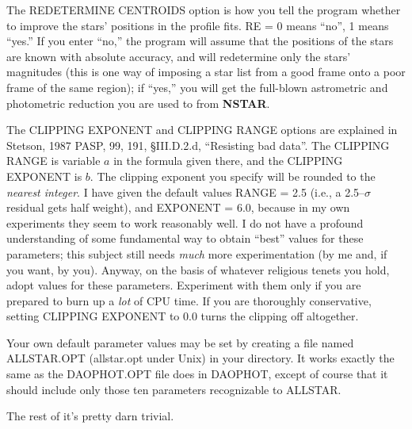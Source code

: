 The REDETERMINE CENTROIDS option is how you tell the program whether
to improve the stars' positions in the profile fits.  RE = 0 means
``no'', 1 means ``yes.''  If you enter ``no,'' the program will
assume that the positions of the stars are known with absolute
accuracy, and will redetermine only the stars' magnitudes (this is
one way of imposing a star list from a good frame onto a poor frame
of the same region); if ``yes,'' you will get the full-blown
astrometric and photometric reduction you are used to from {\bf NSTAR}.

The CLIPPING EXPONENT and CLIPPING RANGE options are explained in
Stetson, 1987 PASP, 99, 191, \S III.D.2.d, ``Resisting bad data''.  The
CLIPPING RANGE is variable $a$ in the formula given there, and the
CLIPPING EXPONENT is $b$.  The clipping exponent you specify will be
rounded to the {\it nearest integer\/}.  I have given the default
values RANGE = 2.5 (i.e., a 2.5--$\sigma$ residual gets half weight),
and EXPONENT = 6.0, because in my own experiments they seem to work
reasonably well. I do not have a profound understanding of some
fundamental way to obtain ``best'' values for these parameters; this
subject still needs {\it much\/} more experimentation (by me and, if
you want, by you).  Anyway, on the basis of whatever religious tenets
you hold, adopt values for these parameters. Experiment with them only
if you are prepared to burn up a {\it lot\/} of CPU time.  If you are
thoroughly conservative, setting CLIPPING EXPONENT to 0.0 turns the
clipping off altogether.

Your own default parameter values may be set by creating a file named
ALLSTAR.OPT (allstar.opt under Unix) in your directory.  It works
exactly the same as the DAOPHOT.OPT file does in DAOPHOT, except of
course that it should include only those ten parameters recognizable to
ALLSTAR.

\vfill
\eject
The rest of it's pretty darn trivial.

